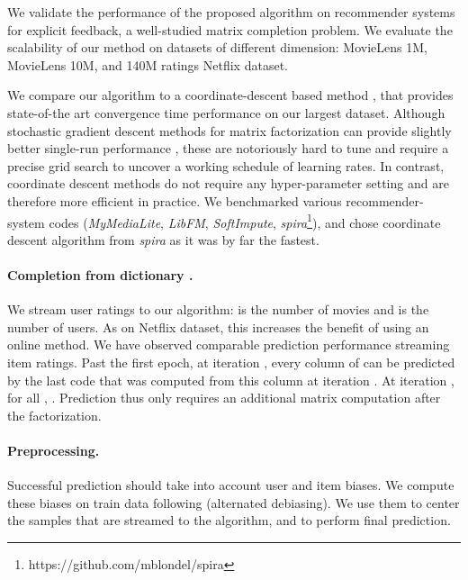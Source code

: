 \documentclass{article}
\begin{document}
We validate the performance of the proposed algorithm on recommender systems
for explicit feedback, a well-studied matrix completion problem.
We evaluate the scalability of our method
on datasets of different dimension: MovieLens 1M, MovieLens
10M, and 140M ratings Netflix dataset.

We compare our algorithm to a coordinate-descent based method
\cite{yu_scalable_2012}, that provides state-of-the art convergence time
performance on our largest dataset. Although stochastic gradient descent methods for
matrix factorization can provide slightly better single-run performance \citep{takacs_scalable_2009}, these are notoriously hard
to tune and require a precise grid search to uncover a working
schedule of learning rates. In contrast, coordinate descent methods do not
require any hyper-parameter setting and are therefore more efficient in
practice.
We benchmarked various recommender-system codes
(\textit{MyMediaLite}, \textit{LibFM}, \textit{SoftImpute},
\textit{spira}\footnote{https://github.com/mblondel/spira}), and chose
coordinate descent algorithm from \textit{spira} as it was by far the fastest.


\paragraph{Completion from dictionary .}
We stream user ratings to our algorithm:  is the number of movies and  is
the number of users. As  on Netflix dataset, this increases
the benefit of using an online method. We have observed comparable prediction
performance streaming item ratings.
Past the first epoch, at iteration , every column  of
 can be predicted by the last code  that was computed
from this column at iteration . At iteration ,
for all , . Prediction thus only requires an additional matrix computation
 after the factorization.


\paragraph{Preprocessing.} Successful prediction should take into account user
and item biases. We compute these biases on train data following \citet{hastie_matrix_2014} (alternated debiasing). We use them to center the samples  that are streamed to
 the algorithm, and to perform final prediction.
\end{document}
